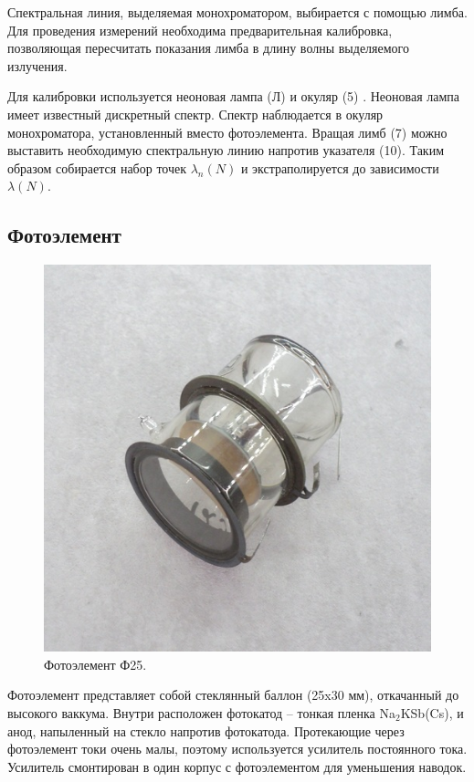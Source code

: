 \documentclass[a4paper, 12pt]{article} %
\begin{document}
	Спектральная линия, выделяемая монохроматором, выбирается с помощью лимба. Для проведения измерений необходима предварительная калибровка, позволяющая пересчитать показания лимба в длину волны выделяемого излучения.
	
	Для калибровки используется неоновая лампа (Л) и окуляр (5) . Неоновая лампа имеет известный дискретный спектр. Спектр наблюдается в окуляр монохроматора, установленный вместо фотоэлемента. Вращая лимб (7) можно выставить необходимую спектральную линию напротив указателя (10). Таким образом собирается набор точек $\lambda_n(N)$ и экстраполируется до зависимости $\lambda(N)$.
	
	\subsection{Фотоэлемент}
	
	\begin{figure}
		\includegraphics[width=\linewidth]{photos/f25.jpg}
		\caption{Фотоэлемент Ф25.}
		\label{fig:photoelem}
	\end{figure}
	
	Фотоэлемент представляет собой стеклянный баллон (25x30 мм), откачанный до высокого ваккума. Внутри расположен фотокатод -- тонкая пленка Na$_2$KSb(Cs), и анод, напыленный на стекло напротив фотокатода. Протекающие через фотоэлемент токи очень малы, поэтому используется усилитель постоянного тока. Усилитель смонтирован в один корпус с фотоэлементом для уменьшения наводок.
	
\end{document}
